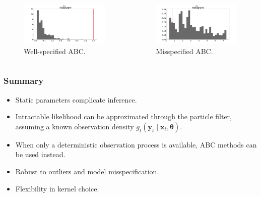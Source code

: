 \documentclass{beamer}
\newcommand{\bx}{\bm{x}}
\newcommand{\by}{\bm{y}}
\newcommand{\btheta}{\bm{\theta}}
\newcommand{\obs}{g}
\begin{document}
\begin{frame}
    \begin{columns}
        \begin{column}{0.45\textwidth}
            \begin{figure}
                \centering
                \includegraphics[width=\columnwidth]{images/ar_abc_g2}
                \caption{Well-specified ABC.}
            \end{figure}
        \end{column}
        \begin{column}{0.45\textwidth}
            \begin{figure}
                \centering
                \includegraphics[width=\columnwidth]{images/ar_abc_c2}
                \caption{Misspecified ABC.}
            \end{figure}
        \end{column}
    \end{columns}
    \end{frame}

    \begin{frame}
    \frametitle{Summary}
    \begin{itemize}
        \item Static parameters complicate inference.
        \item Intractable likelihood can be approximated through the particle filter, assuming a known observation density $\obs_t(\by_t \mid \bx_t, \btheta)$.
        \item When only a deterministic observation process is available, ABC methods can be used instead.
        \item Robust to outliers and model misspecification.
        \item Flexibility in kernel choice.
    \end{itemize}
    \end{frame}
\end{document}
